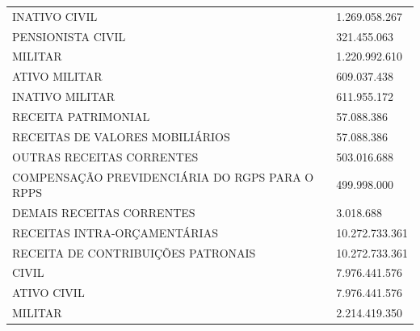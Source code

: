 \documentclass{article}
\begin{document}
\begin{longtable}[c]{m{12cm}m{3cm}}
\multicolumn{1}{L{12cm}}{\hspace{8em} INATIVO CIVIL} & \multicolumn{1}{R{3cm}}{1.269.058.267} \\
\multicolumn{1}{L{12cm}}{\hspace{8em} PENSIONISTA CIVIL} & \multicolumn{1}{R{3cm}}{321.455.063} \\
\multicolumn{1}{L{12cm}}{\hspace{6em} MILITAR} & \multicolumn{1}{R{3cm}}{1.220.992.610} \\
\multicolumn{1}{L{12cm}}{\hspace{8em} ATIVO MILITAR} & \multicolumn{1}{R{3cm}}{609.037.438} \\
\multicolumn{1}{L{12cm}}{\hspace{8em} INATIVO MILITAR} & \multicolumn{1}{R{3cm}}{611.955.172} \\
\multicolumn{1}{L{12cm}}{\hspace{4em} RECEITA PATRIMONIAL} & \multicolumn{1}{R{3cm}}{57.088.386} \\
\multicolumn{1}{L{12cm}}{\hspace{6em} RECEITAS DE VALORES MOBILIÁRIOS} & \multicolumn{1}{R{3cm}}{57.088.386} \\
\multicolumn{1}{L{12cm}}{\hspace{4em} OUTRAS RECEITAS CORRENTES} & \multicolumn{1}{R{3cm}}{503.016.688} \\
\multicolumn{1}{L{12cm}}{\hspace{6em} COMPENSAÇÃO PREVIDENCIÁRIA DO RGPS PARA O RPPS} & \multicolumn{1}{R{3cm}}{499.998.000} \\
\multicolumn{1}{L{12cm}}{\hspace{6em} DEMAIS RECEITAS CORRENTES} & \multicolumn{1}{R{3cm}}{3.018.688} \\
\multicolumn{1}{L{12cm}}{\hspace{2em} RECEITAS INTRA-ORÇAMENTÁRIAS} & \multicolumn{1}{R{3cm}}{10.272.733.361} \\
\multicolumn{1}{L{12cm}}{\hspace{4em} RECEITA DE CONTRIBUIÇÕES PATRONAIS} & \multicolumn{1}{R{3cm}}{10.272.733.361} \\
\multicolumn{1}{L{12cm}}{\hspace{6em} CIVIL} & \multicolumn{1}{R{3cm}}{7.976.441.576} \\
\multicolumn{1}{L{12cm}}{\hspace{8em} ATIVO CIVIL} & \multicolumn{1}{R{3cm}}{7.976.441.576} \\
\multicolumn{1}{L{12cm}}{\hspace{6em} MILITAR} & \multicolumn{1}{R{3cm}}{2.214.419.350} \\

\end{longtable}
\end{document}
